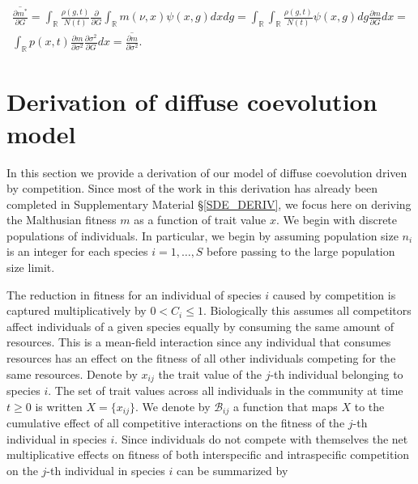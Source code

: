\documentclass[]{article}
\begin{document}
\begin{multline}
\overline{\frac{\partial m^*}{\partial G}}=\int_{\mathbb{R}}\frac{\rho(g,t)}{N(t)}\frac{\partial}{\partial G}\int_\mathbb{R}m(\nu,x)\psi(x,g)dxdg=\int_{\mathbb{R}}\int_\mathbb{R}\frac{\rho(g,t)}{N(t)}\psi(x,g)dg\frac{\partial m}{\partial G}dx= \\
\int_\mathbb{R}p(x,t)\frac{\partial m}{\partial\sigma^2}\frac{\partial\sigma^2}{\partial G}dx=\overline{\frac{\partial m}{\partial\sigma^2}}.
\end{multline}

\hypertarget{derivation-of-diffuse-coevolution-model}{%
\section{\texorpdfstring{Derivation of diffuse coevolution model
\label{diffuse}}{Derivation of diffuse coevolution model }}\label{derivation-of-diffuse-coevolution-model}}

In this section we provide a derivation of our model of diffuse
coevolution driven by competition. Since most of the work in this
derivation has already been completed in Supplementary Material
\S\ref{SDE_DERIV}, we focus here on deriving the Malthusian fitness
\(m\) as a function of trait value \(x\). We begin with discrete
populations of individuals. In particular, we begin by assuming
population size \(n_i\) is an integer for each species \(i=1,\dots,S\)
before passing to the large population size limit.

The reduction in fitness for an individual of species \(i\) caused by
competition is captured multiplicatively by \(0<C_i\leq1\). Biologically
this assumes all competitors affect individuals of a given species
equally by consuming the same amount of resources. This is a mean-field
interaction since any individual that consumes resources has an effect
on the fitness of all other individuals competing for the same
resources. Denote by \(x_{ij}\) the trait value of the \(j\)-th
individual belonging to species \(i\). The set of trait values across
all individuals in the community at time \(t\geq0\) is written
\(X=\{x_{ij}\}\). We denote by \(\mathscr{B}_{ij}\) a function that maps
\(X\) to the cumulative effect of all competitive interactions on the
fitness of the \(j\)-th individual in species \(i\). Since individuals
do not compete with themselves the net multiplicative effects on fitness
of both interspecific and intraspecific competition on the \(j\)-th
individual in species \(i\) can be summarized by
\end{document}
